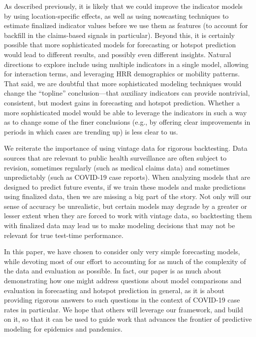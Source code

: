\documentclass[9pt,twocolumn,twoside,lineno]{pnas-new}
\begin{document}
As described previously, it is likely that we could improve the indicator models
by using location-specific effects, as well as using nowcasting techniques to
estimate finalized indicator values before we use them as features (to account
for backfill in the claims-based signals in particular).  Beyond this, it is
certainly possible that more sophisticated models for forecasting or hotspot
prediction would lead to different results, and possibly even different
insights. Natural directions to explore include using multiple indicators in a
single model, allowing for interaction terms, and leveraging HRR demographics or
mobility patterns.  That said, we are doubtful that more sophisticated modeling
techniques would change the ``topline'' conclusion---that auxiliary indicators
can provide nontrivial, consistent, but modest gains in forecasting and hotspot
prediction. Whether a more sophisticated model would be able to leverage the
indicators in such a way as to change some of the finer conclusions (e.g., by 
offering clear improvements in periods in which cases are trending up) is less 
clear to us.

We reiterate the importance of using vintage data for rigorous backtesting. Data
sources that are relevant to public health surveillance are often subject to
revision, sometimes regularly (such as medical claims data) and sometimes
unpredictably (such as COVID-19 case reports).  When analyzing models that are
designed to predict future events, if we train these models and make predictions
using finalized data, then we are missing a big part of the story.  Not only
will our sense of accuracy be unrealistic, but certain models may degrade by a
greater or lesser extent when they are forced to work with vintage data, so 
backtesting them with finalized data may lead us to make modeling decisions that
may not be relevant for true test-time performance.    

In this paper, we have chosen to consider only very simple forecasting models,
while devoting most of our effort to accounting for as much of the complexity of
the data and evaluation as possible.  In fact, our paper is as much about
demonstrating how one might address questions about model comparisons and
evaluation in forecasting and hotspot prediction in general, as it is about
providing rigorous answers to such questions in the context of COVID-19 case
rates in particular.  We hope that others will leverage our framework, and build
on it, so that it can be used to guide work that advances the frontier of
predictive modeling for epidemics and pandemics.


\showacknow{} %


\end{document}
